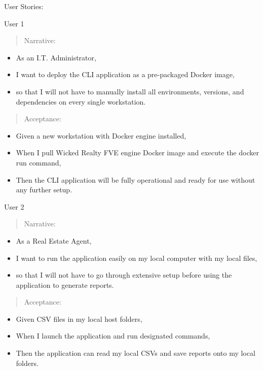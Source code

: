 \documentclass[
]{article}
\begin{document}
User Stories:

User 1

\begin{quote}
Narrative:
\end{quote}

\begin{itemize}
\item
  As an I.T. Administrator,
\item
  I want to deploy the CLI application as a pre-packaged Docker image,
\item
  so that I will not have to manually install all environments,
  versions, and dependencies on every single workstation.
\end{itemize}

\begin{quote}
Acceptance:
\end{quote}

\begin{itemize}
\item
  Given a new workstation with Docker engine installed,
\item
  When I pull Wicked Realty FVE engine Docker image and execute the
  docker run command,
\item
  Then the CLI application will be fully operational and ready for use
  without any further setup.
\end{itemize}

User 2

\begin{quote}
Narrative:
\end{quote}

\begin{itemize}
\item
  As a Real Estate Agent,
\item
  I want to run the application easily on my local computer with my
  local files,
\item
  so that I will not have to go through extensive setup before using the
  application to generate reports.
\end{itemize}

\begin{quote}
Acceptance:
\end{quote}

\begin{itemize}
\item
  Given CSV files in my local host folders,
\item
  When I launch the application and run designated commands,
\item
  Then the application can read my local CSVs and save reports onto my
  local folders.
\end{itemize}
\end{document}
